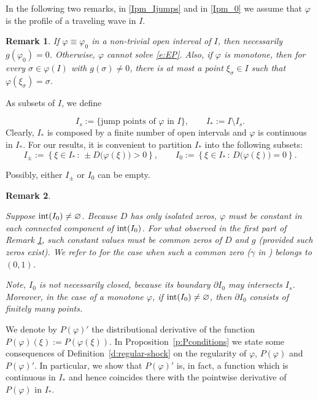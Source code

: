 \documentclass[11pt,a4paper]{article}
\newtheorem{remark}{Remark}[section]
\renewcommand{\phi}{\varphi}
\begin{document}
\smallskip
In the following two remarks, in \eqref{Ipm_Ijumps} and in \eqref{Ipm_0} we assume that  $\varphi$ is the profile of a traveling wave in $I$.

\begin{remark}\label{r:I0}
{
\rm
If $\varphi\equiv \varphi_0$ in a non-trivial open interval of $I$, then necessarily $g(\varphi_0)=0$. Otherwise, $\varphi$ cannot solve \eqref{e:EP}. Also, if $\phi$ is monotone, then for every $\sigma\in \varphi(I)$ with $g(\sigma)\ne 0$, there is at most a point $\xi_{\sigma}\in I$ such that $\phi(\xi_{\sigma})=\sigma$.
}
\end{remark}
As subsets of $I$, we define

\begin{equation}
\label{Ipm_Ijumps}
I_s := \{\text{jump points of $\varphi$ in $I$}\}, 
\qquad 
I_* := I \setminus I_s .
\end{equation}
Clearly, $I_*$ is composed by a finite number of open intervals and $\varphi$ is continuous in $I_*$. For our results, it is convenient to partition $I_*$ into the following subsets:
\begin{equation}
\label{Ipm_0}
I_{\pm} := \left\{ \xi \in I_* \,:\, \pm D\bigl(\varphi(\xi)\bigr) > 0 \right\},
\qquad
I_0 := \left\{ \xi \in I_* \,:\, D\bigl(\varphi(\xi)\bigr) = 0 \right\}.
\end{equation}

Possibly, either $I_\pm$ or $I_0$ can be empty.



\begin{remark}\label{r:I0_2}
{
\rm
Suppose ${\rm int}(I_0) \neq \varnothing$. Because $D$ has only isolated zeros, $\varphi$ must be constant in each connected component of ${\rm int}(I_0)$. For what observed in the first part of Remark \ref{r:I0}, such constant values must be common zeros of $D$ and $g$ (provided such zeros exist). We refer to \cite{BCM3} for the case when such a common zero ($\gamma$ in \cite{BCM3}) belongs to $(0,1)$.

Note,  $I_0$ is not necessarily closed, because its boundary $\partial I_0$ may intersects $I_{s}$. Moreover, in the case of a monotone $\varphi$, if ${\rm int}(I_0) \neq \varnothing$, then $\partial I_0$ consists of finitely many points.
}
\end{remark}

\smallskip
 We denote by $P(\phi)'$ the distributional derivative of the function $P(\phi)(\xi):=P\left(\phi(\xi)\right)$. In Proposition~\ref{p:Pconditions} we state some consequences of Definition~\ref{d:regular-shock}  on the regularity of $\varphi$, $P(\varphi)$ and $P(\varphi)'$. In particular, we show that $P(\phi)'$ is, in fact, a function which is continuous in $I_*$ and hence coincides there with the pointwise derivative of $P(\phi)$ in $I_*$. 
\end{document}
